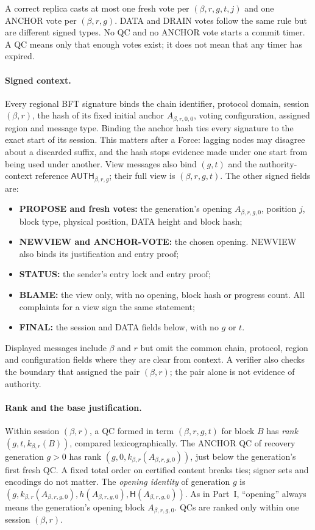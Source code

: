 \documentclass[11pt,a4paper]{article}
\newcommand{\Hash}{\mathsf H}
\newcommand{\tagg}[1]{\ensuremath{\mathsf{#1}}}
\newcommand{\defterm}[1]{\textcolor{rrBlue}{\textit{#1}}}
\newcounter{protocol}
\begin{document}
A correct replica casts at most one fresh vote per $(\beta,r,g,t,j)$ and
one ANCHOR vote per $(\beta,r,g)$. DATA and DRAIN votes follow the same
rule but are different signed types. No QC and no ANCHOR vote starts a
commit timer. A QC means only that enough votes exist; it does not mean
that any timer has expired.

\paragraph{Signed context.}
Every regional BFT signature binds the chain identifier, protocol domain, session
$(\beta,r)$, the hash of its fixed initial anchor $A_{\beta,r,0,0}$,
voting configuration, assigned region and message type. Binding the
anchor hash ties every signature to the exact start of its session. This
matters after a Force: lagging nodes may disagree about a discarded
suffix, and the hash stops evidence made under one start from being used
under another. View messages also bind $(g,t)$ and the authority-context
reference $\tagg{AUTH}_{\beta,r,g}$; their full view is $(\beta,r,g,t)$. The
other signed fields are:
\begin{itemize}
\item \textbf{PROPOSE and fresh votes:} the generation's opening
$A_{\beta,r,g,0}$, position $j$, block type, physical position, DATA
height and block hash;
\item \textbf{NEWVIEW and ANCHOR-VOTE:} the chosen opening. NEWVIEW
also binds its justification and entry proof;
\item \textbf{STATUS:} the sender's entry lock and entry proof;
\item \textbf{BLAME:} the view only, with no opening, block hash or
progress count. All complaints for a view sign the same statement;
\item \textbf{FINAL:} the session and DATA fields below, with no $g$ or $t$.
\end{itemize}
Displayed messages include $\beta$ and $r$ but omit the common chain,
protocol, region and configuration fields where they are clear from
context. A verifier also checks the boundary that assigned the pair
$(\beta,r)$; the pair alone is not evidence of authority.

\paragraph{Rank and the base justification.}
Within session $(\beta,r)$, a QC formed in term $(\beta,r,g,t)$ for block
$B$ has \defterm{rank} $(g,t,k_{\beta,r}(B))$, compared lexicographically.
The ANCHOR QC of recovery generation $g>0$ has rank $(g,0,k_{\beta,r}(A_{\beta,r,g,0}))$,
just below the generation's first fresh QC. A fixed total order on
certified content breaks ties; signer sets and encodings do not matter.
The \defterm{opening identity} of generation $g$ is
$(g,k_{\beta,r}(A_{\beta,r,g,0}),h(A_{\beta,r,g,0}),\Hash(A_{\beta,r,g,0}))$.
As in Part~I, ``opening'' always means the generation's opening block
$A_{\beta,r,g,0}$. QCs are ranked only within one session $(\beta,r)$.
\end{document}
